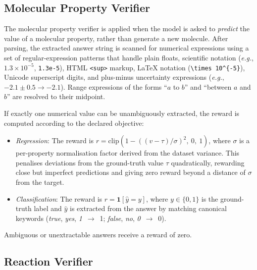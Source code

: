 \subsection{Molecular Property Verifier}
\label{app:verifier:molprop}

The molecular property verifier is applied when the model is asked to
\textit{predict} the value of a molecular property, rather than generate a
new molecule.  After parsing, the extracted answer string is scanned for
numerical expressions using a set of regular-expression patterns that handle
plain floats, scientific notation (\textit{e.g.}, $1.3 \times 10^{-5}$,
\texttt{1.3e-5}), HTML \texttt{<sup>} markup, LaTeX notation
(\texttt{\textbackslash{}times 10\textasciicircum\{-5\}}), Unicode superscript
digits, and plus-minus uncertainty expressions
(\textit{e.g.}, $-2.1 \pm 0.5 \to -2.1$).  Range expressions of the forms
``$a$ to $b$'' and ``between $a$ and $b$'' are resolved to their midpoint.

If exactly one numerical value can be unambiguously extracted, the reward is
computed according to the declared objective:

\begin{itemize}
  \item \textit{Regression}: The reward is
        $r = \mathrm{clip}(1 - ((v - \tau) / \sigma)^2,\ 0,\ 1)$, where
        $\sigma$ is a per-property normalisation factor derived from the
        dataset variance.  This penalises deviations from the ground-truth
        value $\tau$ quadratically, rewarding close but imperfect predictions
        and giving zero reward beyond a distance of $\sigma$ from the target.
  \item \textit{Classification}: The reward is $r = \mathbf{1}[\hat{y} = y]$,
        where $y \in \{0, 1\}$ is the ground-truth label and $\hat{y}$ is
        extracted from the answer by matching canonical keywords
        (\textit{true}, \textit{yes}, \textit{1}~$\to$~1; \textit{false},
        \textit{no}, \textit{0}~$\to$~0).
\end{itemize}

Ambiguous or unextractable answers receive a reward of zero.

\subsection{Reaction Verifier}
\label{app:verifier:reaction}

